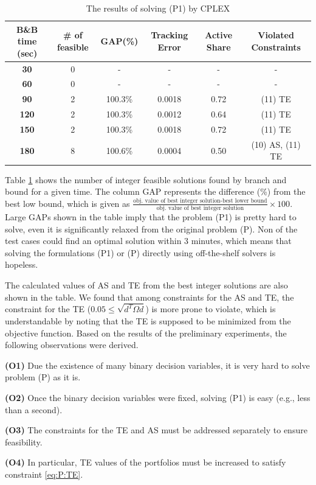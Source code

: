 \documentclass[11pt]{article}
\begin{document}
	\begin{table}[]
		\centering
		\footnotesize 
		\caption{The results of solving (P1) by CPLEX}
		\label{tab:pre}
		\begin{tabular}{cccccc}
			\toprule
			\textbf{B\&B time (sec)} & \textbf{\# of feasible} & \textbf{GAP(\%)} & \textbf{Tracking Error} & \textbf{Active Share} & \textbf{Violated Constraints} \\
			\midrule
			\textbf{30} & 0 & - & - & - & -  \\
			\textbf{60} & 0 & - & - & - & -  \\
			\textbf{90} & 2 & 100.3\% & {\color[HTML]{CB0000} 0.0018} & 0.72 & (11) TE \\
			\textbf{120} & 2 & 100.3\% & {\color[HTML]{CB0000} 0.0012} & 0.64 & (11) TE \\
			\textbf{150} & 2 & 100.3\% & {\color[HTML]{CB0000} 0.0018} & 0.72 & (11) TE \\
			\textbf{180} & 8 & 100.6\% & {\color[HTML]{CB0000} 0.0004} & {\color[HTML]{CB0000} 0.50} & (10) AS, (11) TE  \\ 
			\bottomrule
		\end{tabular}
	\end{table}
	
	Table \ref{tab:pre} shows the number of integer feasible solutions found by branch and bound for a given time. The column GAP represents the difference (\%) from the best low bound, which is given as $\frac{\text{obj. value of best integer solution-best lower bound}}{\text{obj. value of best integer solution}} \times 100$. Large GAPs shown in the table imply that the problem (P1) is pretty hard to solve, even it is significantly relaxed from the original problem (P). Non of the test cases could find an optimal solution within 3 minutes, which means that solving the formulations (P1) or (P) directly using off-the-shelf solvers is hopeless. 
	
	The calculated values of AS and TE from the best integer solutions are also shown in the table. We found that among constraints for the AS and TE, the constraint for the TE ($0.05 \le \sqrt{d^T \Omega d}$) is more prone to violate, which is understandable by noting that the TE is supposed to be minimized from the objective function. Based on the results of the preliminary experiments, the following observations were derived.
	\begin{description}
		\item \textbf{(O1)} Due the existence of many binary decision variables, it is very hard to solve problem (P) as it is.
		\item \textbf{(O2)} Once the binary decision variables were fixed, solving (P1) is easy (e.g., less than a second).
		\item \textbf{(O3)} The constraints for the TE and AS must be addressed separately to ensure feasibility.
		\item \textbf{(O4)} In particular, TE values of the portfolios must be increased to satisfy constraint \eqref{eq:P:TE}.
	\end{description}
	
\end{document}
